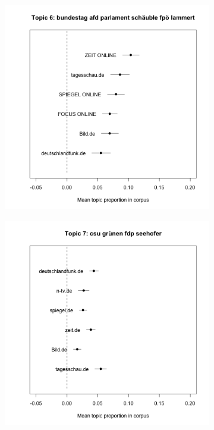 \documentclass[12pt,a4paper,notitlepage]{article}
\begin{document}
\begin{figure}[H]
\begin{center}
\begin{subfigure}[normla]{0.2\textwidth}
		\end{subfigure}
				\begin{subfigure}[normla]{0.2\textwidth}
			\includegraphics[width=\textwidth]{../figs/estimate_effect6.png}
		\end{subfigure}
		\begin{subfigure}[normla]{0.2\textwidth}
			\includegraphics[width=\textwidth]{../figs/estimate_effect7.png}

\end{subfigure}
\end{center}
\end{figure}
\end{document}
